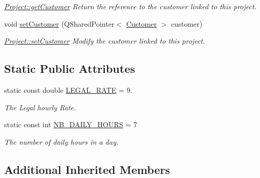 \begin{DoxyCompactItemize}
\begin{DoxyCompactList}\small\item\em \hyperlink{classModels_1_1Project_ad15f442a24c9d42144b73f27a7afaa35}{Project\+::get\+Customer} Return the reference to the customer linked to this project. \end{DoxyCompactList}\item 
void \hyperlink{classModels_1_1Project_a9d305edf054735b911e144516d3eccba}{set\+Customer} (Q\+Shared\+Pointer$<$ \hyperlink{classModels_1_1Customer}{Customer} $>$ customer)
\begin{DoxyCompactList}\small\item\em \hyperlink{classModels_1_1Project_a9d305edf054735b911e144516d3eccba}{Project\+::set\+Customer} Modify the {\itshape customer} linked to this project. \end{DoxyCompactList}\end{DoxyCompactItemize}
\subsection*{Static Public Attributes}
\begin{DoxyCompactItemize}
\item 
\hypertarget{classModels_1_1Project_ad3dc764849815160de77877b1e261c86}{static const double \hyperlink{classModels_1_1Project_ad3dc764849815160de77877b1e261c86}{L\+E\+G\+A\+L\+\_\+\+R\+A\+T\+E} = 9.}\label{classModels_1_1Project_ad3dc764849815160de77877b1e261c86}

\begin{DoxyCompactList}\small\item\em The Legal hourly Rate. \end{DoxyCompactList}\item 
\hypertarget{classModels_1_1Project_a2cde659bf6be8b4919d7b4b7a53c336f}{static const int \hyperlink{classModels_1_1Project_a2cde659bf6be8b4919d7b4b7a53c336f}{N\+B\+\_\+\+D\+A\+I\+L\+Y\+\_\+\+H\+O\+U\+R\+S} = 7}\label{classModels_1_1Project_a2cde659bf6be8b4919d7b4b7a53c336f}

\begin{DoxyCompactList}\small\item\em The number of daily hours in a day. \end{DoxyCompactList}\end{DoxyCompactItemize}
\subsection*{Additional Inherited Members}


